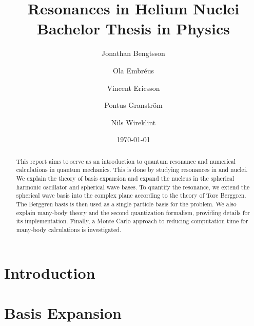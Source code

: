 \documentclass[12pt,a4paper]{report}
\begin{document}
  

\listoftodos


\title{Resonances in Helium Nuclei\\ 
\Large Bachelor Thesis in Physics}
\author{Jonathan Bengtsson  \and Ola Embréus \and Vincent Ericsson \and Pontus Granström \and Nils Wireklint}
\date{\today}



\maketitle

\newpage
\begin{abstract}
This report aims to serve as an introduction to quantum resonance and 
numerical calculations in quantum mechanics. This is done by studying
resonances in  and  nuclei. We explain the theory of basis
expansion and expand the  nucleus in the spherical harmonic oscillator
and spherical wave bases. To quantify the  resonance, we extend the
spherical wave basis into the complex plane according to the 
theory of Tore Berggren. The Berggren basis is then used as a single particle
basis for the  problem. We also explain many-body theory and the second
quantization formalism, providing details for its implementation. Finally, a
Monte Carlo approach to reducing computation time for many-body 
calculations is investigated.

\end{abstract}
\newpage


\tableofcontents
\newpage

\setcounter{page}{1}

\chapter{Introduction}
\label{cha:introduction}



\chapter{Basis Expansion}
\label{cha:basis expansion}

\end{document}
